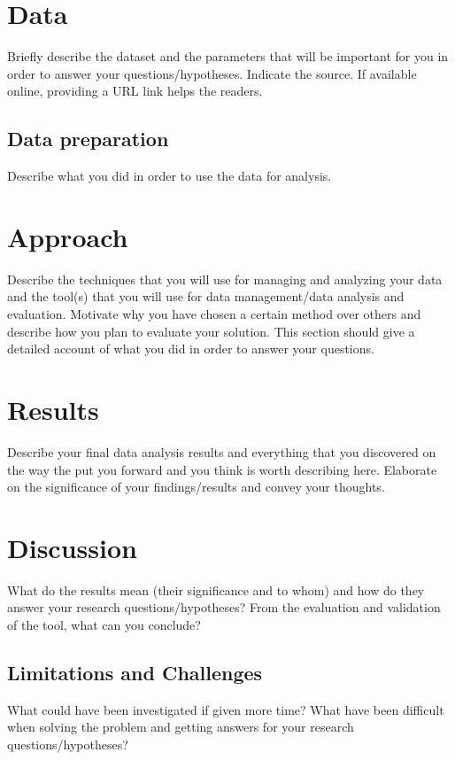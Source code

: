 \section{Data}
\label{chap:data}
Briefly describe the dataset and the parameters that will be important for you in order to answer your questions/hypotheses. Indicate the source. If available online, providing a URL link helps the readers.

\subsection{Data preparation}
\label{sec:data}
Describe what you did in order to use the data for analysis.

\section{Approach}
\label{chap:approach}
Describe the techniques that you will use for managing and analyzing your data and the tool(s) that you will use for data management/data analysis and evaluation. Motivate why you have chosen a certain method over others and describe how you plan to evaluate your solution. This section should give a detailed account of what you did in order to answer your questions.

\section{Results}
\label{chap:results}
Describe your final data analysis results and everything that you discovered on the way the put you forward and you think is worth describing here. Elaborate on the significance of your findings/results and convey your thoughts. 

\section{Discussion}
\label{chap:discussion}
What do the results mean (their significance and to whom) and how do they answer your research questions/hypotheses? From the evaluation and validation of the tool, what can you conclude? 

\subsection{Limitations and Challenges}
\label{sec:limitation}
What could have been investigated if given more time? What have been difficult when solving the problem and getting answers for your research questions/hypotheses?

